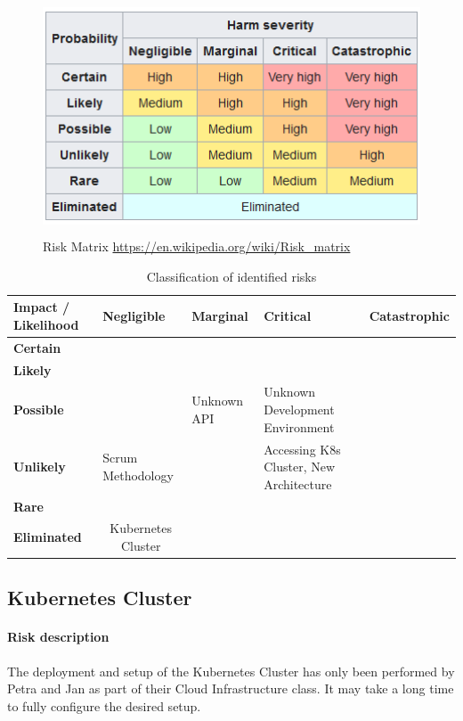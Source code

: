 \begin{figure}[h]
    \centering
    \includegraphics[height=7cm]{resources/risk-matrix.png}
    \caption{Risk Matrix \url{https://en.wikipedia.org/wiki/Risk_matrix}}
    \label{fig:risk-matrix}
\end{figure}


\begin{table}[h]
    \caption{Classification of identified risks}
    \label{tab:risk-classification}
    \begin{tabular*}{\textwidth}{ p{2.2cm} | p{2.3cm} | p{2cm} | p{3.5cm} | p{1cm} }
        \textbf{Impact / Likelihood} & \textbf{Negligible} & \textbf{Marginal} & \textbf{Critical} & \textbf{Catastrophic} \\ \hline
        \textbf{Certain}     & & & & \\ \hline
        \textbf{Likely}      & & & & \\ \hline
        \textbf{Possible}    & & Unknown API & Unknown Development Environment & \\ \hline
        \textbf{Unlikely}    & Scrum Methodology & & Accessing K8s Cluster, New Architecture & \\ \hline
        \textbf{Rare}        & & & & \\ \hline
        \textbf{Eliminated}  & \multicolumn{1}{c}{Kubernetes Cluster} \\
    \end{tabular*}
\end{table}

\subsection{Kubernetes Cluster}
\paragraph{Risk description} The deployment and setup of the Kubernetes Cluster has only been performed by Petra and Jan as part of their Cloud Infrastructure class. It may take a long time to fully configure the desired setup.

